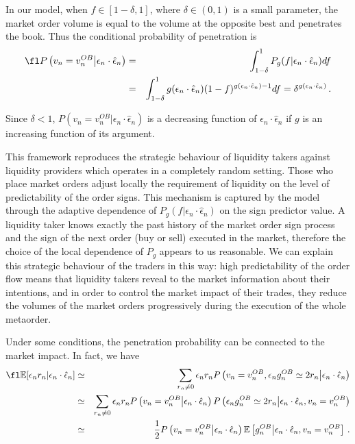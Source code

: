 \documentclass[12pt]{iopart}
\begin{document}
In our model, when $f\in[1-\delta,1]$, where $\delta\in(0,1)$ is a small parameter, the market order volume is equal to the volume at the opposite best and penetrates the book. Thus the conditional probability of penetration is
\begin{eqnarray*}
\fl P\left(v_n = v_n^{OB}\big|\epsilon_n\cdot\hat{\epsilon}_n\right)&=&\int_{1-\delta}^1 P_{g}(f|\epsilon_n\cdot\hat{\epsilon}_n)df \\
&=&\int_{1-\delta}^1 g(\epsilon_n\cdot\hat{\epsilon}_n)(1-f)^{g(\epsilon_n\cdot\hat{\epsilon}_n)-1}df=\delta^{g(\epsilon_n\cdot\hat{\epsilon}_n)}\,.
\end{eqnarray*}

Since $\delta<1$, $P\left(v_n = v_n^{OB}\big|\epsilon_n\cdot\hat{\epsilon}_n\right)$ is a decreasing function of $\epsilon_n\cdot\hat{\epsilon}_n$ if $g$ is an increasing function of its argument. 

This framework reproduces the strategic behaviour of liquidity takers against liquidity providers which operates in a completely random setting. Those who place market orders adjust locally the requirement of liquidity on the level of predictability of the order signs. This mechanism is captured by the model through the adaptive dependence of $P_{g}(f|\epsilon_n\cdot\hat{\epsilon}_n)$ on the sign predictor value. A liquidity taker knows exactly the past history of the market order sign process and the sign of the next order (buy or sell) executed in the market, therefore the choice of the local dependence of $P_g$ appears to us reasonable. We can explain this strategic behaviour of the traders in this way: high predictability of the order flow means that liquidity takers reveal to the market information about their intentions, and in order to control the market impact of their trades, they reduce the volumes of the market orders progressively during the execution of the whole metaorder.

Under some conditions, the penetration probability can be connected to the market impact. In fact, we have
\begin{eqnarray*}
\fl \mathbb{E}[\epsilon_n r_n|\epsilon_n\cdot\hat{\epsilon}_n]&\simeq&\sum_{r_n \neq 0}\epsilon_n r_n P\left(v_n = v_n^{OB},\epsilon_n g_n^{OB} \simeq 2r_n\big|\epsilon_n\cdot\hat{\epsilon}_n\right) \nonumber \\
&\simeq&\sum_{r_n \neq 0}\epsilon_n r_n P\left(v_n = v_n^{OB}\big|\epsilon_n\cdot\hat{\epsilon}_n\right)P\left(\epsilon_n g_n^{OB} \simeq 2r_n\big|\epsilon_n\cdot\hat{\epsilon}_n,v_n = v_n^{OB}\right) \nonumber \\
&\simeq&\frac{1}{2}P\left(v_n = v_n^{OB}\big|\epsilon_n\cdot\hat{\epsilon}_n\right)\mathbb{E}\left[g_n^{OB}\big|\epsilon_n\cdot\hat{\epsilon}_n,v_n = v_n^{OB}\right]\,.
\end{eqnarray*}
\end{document}
